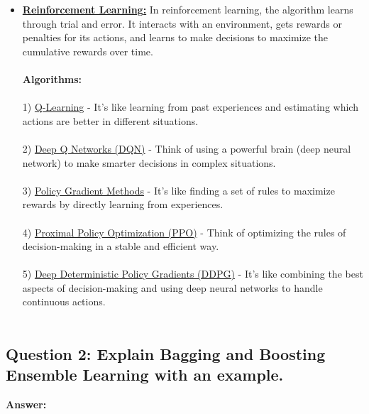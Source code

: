 \documentclass[12pt]{article}
\begin{document}
\begin{itemize}
   \item \textbf{\underline{Reinforcement Learning:}} In reinforcement learning, the algorithm learns through trial and error. It interacts with an environment, gets rewards or penalties for its actions, and learns to make decisions to maximize the cumulative rewards over time.
   \\\\
   \textbf{Algorithms:}
   \\\\
   1) \underline{Q-Learning} -  It's like learning from past experiences and estimating which actions are better in different situations.\\\\
   2) \underline{Deep Q Networks (DQN)} - Think of using a powerful brain (deep neural network) to make smarter decisions in complex situations.\\\\
   3) \underline{Policy Gradient Methods} - It's like finding a set of rules to maximize rewards by directly learning from experiences.\\\\
   4) \underline{Proximal Policy Optimization (PPO)} - Think of optimizing the rules of decision-making in a stable and efficient way.\\\\
   5) \underline{Deep Deterministic Policy Gradients (DDPG)} - It's like combining the best aspects of decision-making and using deep neural networks to handle continuous actions.\\\\

   \end{itemize}




\subsection*{Question 2: Explain Bagging and Boosting Ensemble Learning with an example.}

\textbf{Answer:}
\\
\end{document}
